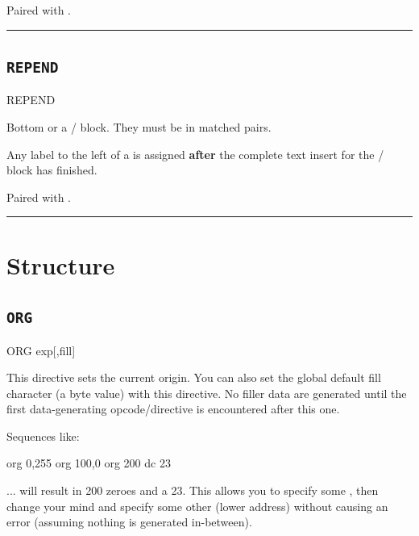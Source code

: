 Paired with .\\

\hrule

\subsection{\texttt{REPEND}}
\label{pseudoop:repend}

\begin{usage}
 REPEND
\end{usage}

Bottom or a / block. They must be in matched pairs.

Any label to the left of a  is assigned \textbf{after} the complete text insert for the / block has finished.

Paired with .\\


\hrule

\section{Structure}

\subsection{\texttt{ORG}}
\label{pseudoop:org}

\begin{usage}
  ORG exp[,fill]
\end{usage}  
 
This directive sets the current origin.  You can also set the
global default fill character (a byte value) with this
directive.  No filler data are generated until the first
data-generating opcode/directive is encountered after this one.

Sequences like:

\begin{code}
    org  0,255
    org  100,0
    org  200
    dc   23
\end{code}

... will result in 200 zeroes and a 23. This allows you to specify
some , then change your mind and specify some other (lower
address)  without causing an error (assuming nothing is
generated in-between).

